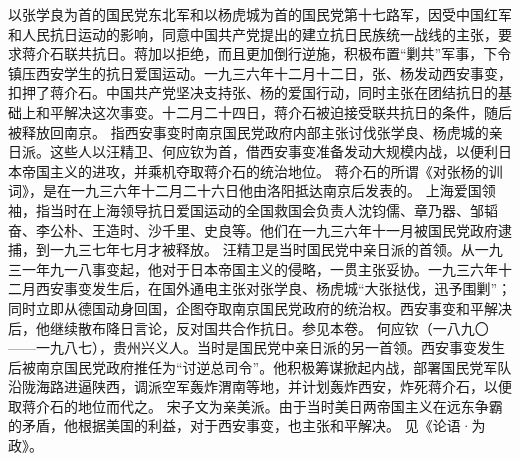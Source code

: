\begin{maonote}
以张学良为首的国民党东北军和以杨虎城为首的国民党第十七路军，因受中国红军和人民抗日运动的影响，同意中国共产党提出的建立抗日民族统一战线的主张，要求蒋介石联共抗日。蒋加以拒绝，而且更加倒行逆施，积极布置“剿共”军事，下令镇压西安学生的抗日爱国运动。一九三六年十二月十二日，张、杨发动西安事变，扣押了蒋介石。中国共产党坚决支持张、杨的爱国行动，同时主张在团结抗日的基础上和平解决这次事变。十二月二十四日，蒋介石被迫接受联共抗日的条件，随后被释放回南京。
指西安事变时南京国民党政府内部主张讨伐张学良、杨虎城的亲日派。这些人以汪精卫、何应钦为首，借西安事变准备发动大规模内战，以便利日本帝国主义的进攻，并乘机夺取蒋介石的统治地位。
蒋介石的所谓《对张杨的训词》，是在一九三六年十二月二十六日他由洛阳抵达南京后发表的。
上海爱国领袖，指当时在上海领导抗日爱国运动的全国救国会负责人沈钧儒、章乃器、邹韬奋、李公朴、王造时、沙千里、史良等。他们在一九三六年十一月被国民党政府逮捕，到一九三七年七月才被释放。
汪精卫是当时国民党中亲日派的首领。从一九三一年九一八事变起，他对于日本帝国主义的侵略，一贯主张妥协。一九三六年十二月西安事变发生后，在国外通电主张对张学良、杨虎城“大张挞伐，迅予围剿”；同时立即从德国动身回国，企图夺取南京国民党政府的统治权。西安事变和平解决后，他继续散布降日言论，反对国共合作抗日。参见本卷。
何应钦（一八九〇——一九八七），贵州兴义人。当时是国民党中亲日派的另一首领。西安事变发生后被南京国民党政府推任为“讨逆总司令”。他积极筹谋掀起内战，部署国民党军队沿陇海路进逼陕西，调派空军轰炸渭南等地，并计划轰炸西安，炸死蒋介石，以便取蒋介石的地位而代之。
宋子文为亲美派。由于当时美日两帝国主义在远东争霸的矛盾，他根据美国的利益，对于西安事变，也主张和平解决。
见《论语·为政》。

\end{maonote}
